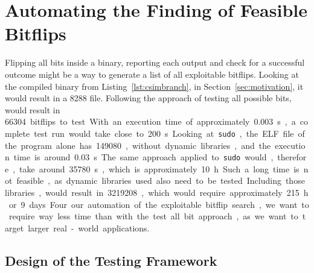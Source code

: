 \section{Automating the Finding of Feasible Bitflips}

Flipping all bits inside a binary, reporting each output and check for a
successful outcome might be a way to generate a list of all exploitable
bitflips. Looking at the compiled binary from Listing~\ref{lst:csimbranch}, in
Section~\ref{sec:motivation}, it would result in a \SI{8288}{\byte} file.
Following the approach of testing all possible bits, would result in \SI{66304}
bitflips to test. With an execution time of approximately \SI{0.003}{\second}, a
complete test run would take close to \SI{200}{\second}.

Looking at \texttt{sudo}, the ELF file of the program alone has
\SI{149080}{\byte}, without dynamic libraries, and the execution time is around
\SI{0.03}{\second}. The same approach applied to \texttt{sudo} would, therefore,
take around \SI{35780}{\second}, which is approximately \SI{10}{\hour}. Such a
long time is not feasible, as dynamic libraries used also need to be tested.
Including those libraries, would result in \SI{3219208}{\byte}, which would
require approximately \SI{215}{\hour} or \SI{9} days.

Four our automation of the exploitable bitflip search, we want to require way
less time than with the test all bit approach, as we want to target larger
real-world applications.

\subsection{Design of the Testing Framework}

